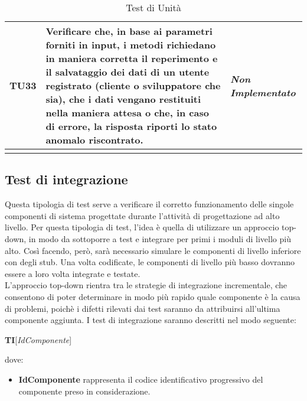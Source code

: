 \begin{longtable}{|>{\centering\arraybackslash}p{1.5cm}|>{\centering\arraybackslash}p{8cm} | >{\centering\arraybackslash}p{3.8cm}|}
		\hypertarget{TU33}{TU33} & Verificare che, in base ai parametri forniti in input, i metodi richiedano in maniera corretta il reperimento e il salvataggio dei dati di un utente registrato (cliente o sviluppatore che sia), che i dati vengano restituiti nella maniera attesa o che, in caso di errore, la risposta riporti lo stato anomalo riscontrato. & \textit{Non Implementato}\\ \hline
		
		\caption[Test di Unità]{Test di Unità}
		\label{tabella:test3}
	\end{longtable}
	\clearpage
	
	\subsection{Test di integrazione}
	Questa tipologia di test serve a verificare il corretto funzionamento delle singole componenti di sistema progettate durante l'attività di progettazione ad alto livello. Per questa tipologia di test, l'idea è quella di utilizzare un approccio top-down, in modo da sottoporre a test e integrare per primi i moduli di livello più alto.
	Così facendo, però, sarà necessario simulare le componenti di livello inferiore con degli stub. Una volta codificate, le componenti di livello più basso dovranno essere a loro volta integrate e testate.\\
	L'approccio top-down rientra tra le strategie di integrazione incrementale, che consentono di poter determinare in modo più rapido quale componente è la causa di problemi, poichè i difetti rilevati dai test saranno da attribuirsi all'ultima componente aggiunta.
	I test di integrazione saranno descritti nel modo seguente:
	\begin{center}
		\textbf{TI}[\textit{IdComponente}]
	\end{center}
	dove:
	\begin{itemize}
		\item
		\textbf{IdComponente} rappresenta il codice identificativo progressivo del componente preso in considerazione.
	\end{itemize}
	
